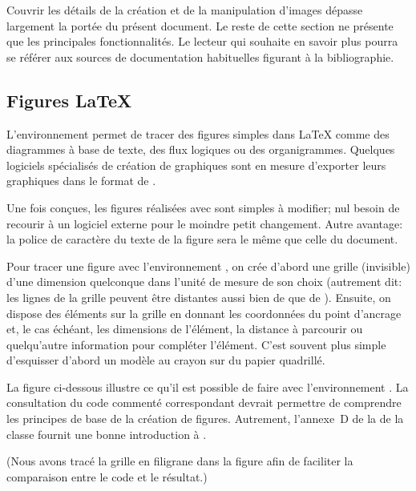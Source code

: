 Couvrir les détails de la création et de la manipulation d'images
dépasse largement la portée du présent document. Le reste de cette
section ne présente que les principales fonctionnalités. Le lecteur
qui souhaite en savoir plus pourra se référer aux sources de documentation habituelles figurant à la
bibliographie.


\subsection{Figures {\LaTeX}}
\label{sec:tableaux:figures:picture}

L'environnement  permet de tracer des figures simples dans
{\LaTeX} comme des diagrammes à base de texte, des flux logiques ou
des organigrammes. Quelques logiciels spécialisés de création de
graphiques sont en mesure d'exporter leurs graphiques dans le format
de .

Une fois conçues, les figures réalisées avec  sont
simples à modifier; nul besoin de recourir à un logiciel externe pour
le moindre petit changement. Autre avantage: la police de caractère du texte
de la figure sera le même que celle du document.

Pour tracer une figure avec l'environnement , on crée
d'abord une grille (invisible) d'une dimension quelconque dans l'unité
de mesure de son choix (autrement dit: les lignes de la grille
peuvent être distantes aussi bien de \code{1pt} que de \code{1cm}).
Ensuite, on dispose des éléments sur la grille en donnant les
coordonnées du point d'ancrage et, le cas échéant, les dimensions de
l'élément, la distance à parcourir ou quelqu'autre information pour
compléter l'élément. C'est souvent plus simple d'esquisser d'abord un modèle au
crayon sur du papier quadrillé.

La figure ci-dessous illustre ce qu'il est possible de faire avec
l'environnement . La consultation du code commenté correspondant devrait
permettre de comprendre les principes de base de la création de
figures. Autrement, l'annexe~D de la %
de la classe  fournit une bonne introduction à .

(Nous avons tracé la grille en filigrane dans la figure afin de
faciliter la comparaison entre le code et le résultat.)

